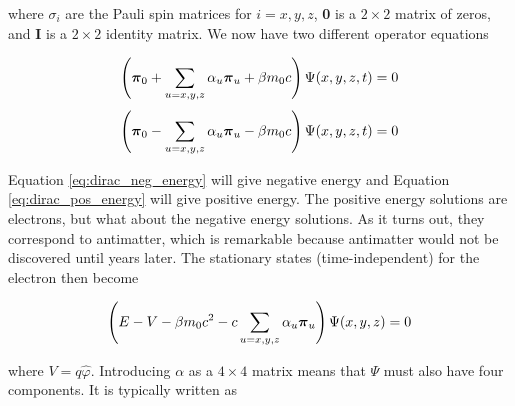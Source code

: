 where $\sigma_{i}$ are the Pauli spin matrices for $i=x,y,z$, \textbf{0} is a $2\times2$ matrix of zeros, and \textbf{I} is a $2\times2$ identity matrix\cite{Piela}. We now have two different operator equations

\begin{equation}
\label{eq:dirac_neg_energy}
\left({\bf{\pi}}_{0} + \sum_{u=x,y,z}\alpha_{u}{\bf{\pi}}_{u} + \beta{}m_{0}c\right)\Psi(x, y, z, t) = 0
\end{equation}
\begin{equation}
\label{eq:dirac_pos_energy}
\left({\bf{\pi}}_{0} - \sum_{u=x,y,z}\alpha_{u}{\bf{\pi}}_{u} - \beta{}m_{0}c\right)\Psi(x, y, z, t) = 0
\end{equation}

Equation \ref{eq:dirac_neg_energy} will give negative energy and Equation \ref{eq:dirac_pos_energy} will give positive energy. The positive energy solutions are electrons, but what about the negative energy solutions. As it turns out, they correspond to antimatter, which is remarkable because antimatter would not be discovered until years later\cite{PhysRev.43.491}. The stationary states (time-independent) for the electron then become

\begin{equation}
\label{eq:dirac_stat_state}
\left(E - V -\beta m_{0}c^{2} - c\sum_{u=x,y,z}\alpha_{u}{\bf{\pi}}_{u}\right)\Psi(x, y, z) = 0
\end{equation}

where $V = q\hat{\varphi}$. Introducing $\alpha$ as a $4\times4$ matrix means that $\Psi$ must also have four components. It is typically written as

